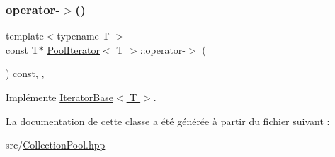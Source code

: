\subsubsection{\texorpdfstring{operator-\/$>$()}{operator->()}\hspace{0.1cm}{\footnotesize\ttfamily [2/2]}}
{\footnotesize\ttfamily template$<$typename T $>$ \\
const T$\ast$ \hyperlink{class_pool_iterator}{Pool\+Iterator}$<$ T $>$\+::operator-\/$>$ (\begin{DoxyParamCaption}{ }\end{DoxyParamCaption}) const\hspace{0.3cm}{\ttfamily [inline]}, {\ttfamily [override]}, {\ttfamily [virtual]}}



Implémente \hyperlink{class_iterator_base_a49d96fd63062ca0d7fd813517ad69f03}{Iterator\+Base$<$ T $>$}.



La documentation de cette classe a été générée à partir du fichier suivant \+:\begin{DoxyCompactItemize}
\item 
src/\hyperlink{_collection_pool_8hpp}{Collection\+Pool.\+hpp}\end{DoxyCompactItemize}
